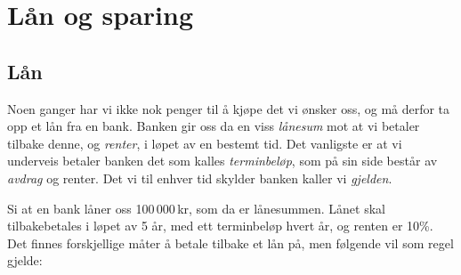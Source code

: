 \section{Lån og sparing}
\subsection{Lån}
Noen ganger har vi  ikke nok penger til å kjøpe det vi ønsker oss, og må derfor ta opp et lån fra en bank. Banken gir oss da en viss \textit{lånesum} mot at vi betaler tilbake denne, og \textit{renter}, i løpet av en bestemt tid. Det vanligste er at vi underveis betaler banken det som kalles \textit{terminbeløp}, som på sin side består av \textit{avdrag} og renter. Det vi til enhver tid skylder banken kaller vi \textit{gjelden}. \vsk

Si at en bank låner  oss 100\,000\,kr, som da er lånesummen. Lånet skal tilbakebetales i løpet av 5 år, med ett terminbeløp hvert år, og renten er 10\%. Det finnes forskjellige måter å betale tilbake et lån på, men følgende vil som regel gjelde:
